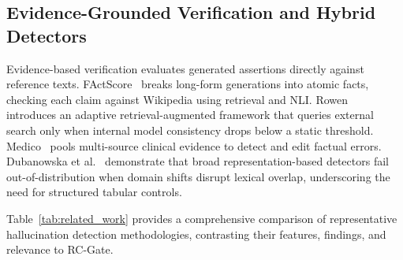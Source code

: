 \documentclass[pdflatex,sn-mathphys,Numbered]{sn-jnl}
\begin{document}
\subsection{Evidence-Grounded Verification and Hybrid Detectors}
Evidence-based verification evaluates generated assertions directly against reference texts. FActScore~\cite{min2023factscore} breaks long-form generations into atomic facts, checking each claim against Wikipedia using retrieval and NLI. Rowen~\cite{ding2024rowen} introduces an adaptive retrieval-augmented framework that queries external search only when internal model consistency drops below a static threshold. Medico~\cite{zhao2024medico} pools multi-source clinical evidence to detect and edit factual errors. Dubanowska et al.~\cite{dubanowska2025ood} demonstrate that broad representation-based detectors fail out-of-distribution when domain shifts disrupt lexical overlap, underscoring the need for structured tabular controls.

Table~\ref{tab:related_work} provides a comprehensive comparison of representative hallucination detection methodologies, contrasting their features, findings, and relevance to RC-Gate.
\end{document}
